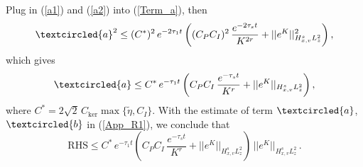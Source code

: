 \documentclass[final,onefignum,onetabnum]{siamart171218}
\begin{document}
Plug in (\ref{a1}) and (\ref{a2}) into (\ref{Term_a}), then 
$$ \textcircled{a}^2 \leq (C^{\ast})^2\, e^{-2 \tau_1 t} \left( (C_P C_I)^2\, \frac{e^{-2 \tau_s t}}{K^{2r}} + ||e^K||_{H_{x,v}^{s}L_z^2}^2\right), $$
which gives 
$$\textcircled{a} \leq C^{\ast}\, e^{-\tau_1 t} \left( C_P C_I\, \frac{e^{-\tau_s t}}{K^r} +  ||e^K||_{H_{x,v}^{s}L_z^2}\right), $$
where $C^{\ast} = 2\sqrt{2}\, C_{\text{ker}}\max\{\tilde\eta, C_{I}\}$. 
With the estimate of term $\textcircled{a}$, $\textcircled{b}$ in (\ref{App_R1}), we conclude that 
\begin{equation}\label{App_R2} \text{RHS} \leq C^{\ast}\, e^{-\tau_1 t} \left( C_P C_I\, \frac{e^{-\tau_s t}}{K^r} +  ||e^K||_{H_{x,v}^{s}L_z^2} \right)\, ||e^K||_{H_{x,v}^{s}L_z^2}\,. 
\end{equation}




\end{document}
